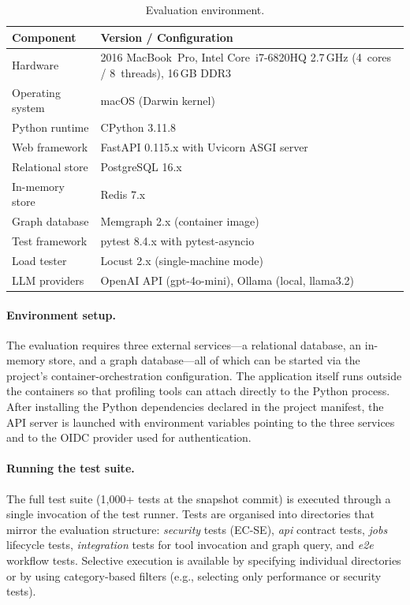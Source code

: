 \documentclass[a4paper,noexaminfo]{sapthesis}
\newcommand{\TestCount}{1,000+}
\begin{document}
\begin{table}[ht]
\centering
\caption{Evaluation environment.}
\label{tab:app-env}
\small
\begin{tabularx}{\textwidth}{@{}l X@{}}
    \hline
    \textbf{Component} & \textbf{Version / Configuration} \\
    \hline
    Hardware          & 2016 MacBook~Pro, Intel Core~i7-6820HQ 2.7\,GHz (4~cores / 8~threads), 16\,GB DDR3 \\
    Operating system  & macOS (Darwin kernel) \\
    Python runtime    & CPython 3.11.8 \\
    Web framework     & FastAPI 0.115.x with Uvicorn ASGI server \\
    Relational store  & PostgreSQL 16.x \\
    In-memory store   & Redis 7.x \\
    Graph database    & Memgraph 2.x (container image) \\
    Test framework    & pytest 8.4.x with pytest-asyncio \\
    Load tester       & Locust 2.x (single-machine mode) \\
    LLM providers     & OpenAI API (gpt-4o-mini), Ollama (local, llama3.2) \\
    \hline
\end{tabularx}
\end{table}

\paragraph{Environment setup.}
The evaluation requires three external services---a relational database,
an in-memory store, and a graph database---all of which can be started
via the project's container-orchestration configuration.  The
application itself runs outside the containers so that profiling tools
can attach directly to the Python process.  After installing the Python
dependencies declared in the project manifest, the API server is
launched with environment variables pointing to the three services and
to the OIDC provider used for authentication.

\paragraph{Running the test suite.}
The full test suite (\TestCount{} tests at the snapshot commit) is
executed through a single invocation of the test runner.  Tests are organised
into directories that mirror the evaluation structure:
\emph{security} tests (EC-SE), \emph{api} contract tests,
\emph{jobs} lifecycle tests, \emph{integration} tests for tool
invocation and graph query, and \emph{e2e} workflow tests.  Selective
execution is available by specifying individual directories or by using
category-based filters (e.g., selecting only performance or security
tests).
\end{document}
